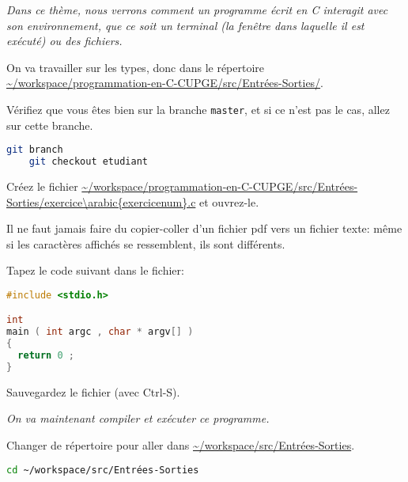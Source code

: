\titre{\tio}


\begin{center}
  \parbox{0.9\textwidth}{%
    \sl Dans ce thème, nous verrons comment un programme écrit en C
    interagit avec son environnement, que ce soit un terminal (la
    fenêtre dans laquelle il est exécuté) ou des fichiers.
  }
\end{center}

On va travailler sur les types, donc dans le répertoire \url{~/workspace/programmation-en-C-CUPGE/src/Entrées-Sorties/}.

\question Vérifiez que vous êtes bien sur la branche
\texttt{master}, et si ce n'est pas le cas, allez sur cette branche.

\begin{solution}
  \begin{lstlisting}[language=bash]
    git branch
    git checkout etudiant
  \end{lstlisting}
\end{solution}

\question Créez le fichier \expandafter\url{~/workspace/programmation-en-C-CUPGE/src/Entrées-Sorties/exercice\arabic{exercicenum}.c} et
ouvrez-le.

\begin{fminipage}{\textwidth}
  Il ne faut jamais faire du copier-coller d'un fichier pdf vers un
  fichier texte: même si les caractères affichés se ressemblent, ils
  sont différents.
\end{fminipage}


\question Tapez le code suivant dans le fichier:
\begin{lstlisting}[language=C]
#include <stdio.h>

int
main ( int argc , char * argv[] )
{
  return 0 ;
}
\end{lstlisting}

\question Sauvegardez le fichier (avec Ctrl-S). 

\begin{center}
  \sl On va maintenant compiler et exécuter ce programme.
\end{center}

\question Changer de répertoire pour aller dans \url{~/workspace/src/Entrées-Sorties}.
\begin{solution}
  \begin{lstlisting}[language=bash]
    cd ~/workspace/src/Entrées-Sorties
  \end{lstlisting}
\end{solution}

